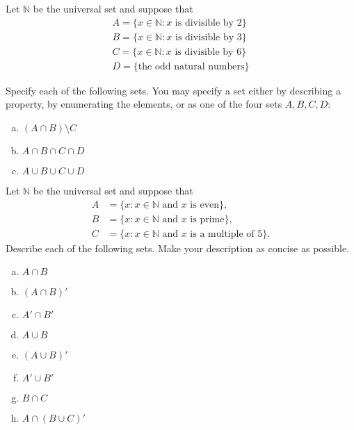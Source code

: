 \begin{exercise}\label{exercise:sets:20}
Let ${\mathbb N}$ be the universal set and suppose that
\begin{align*}
A = \{ x \in {\mathbb N} : x \text{ is divisible by 2}\} \\ 
B = \{ x \in {\mathbb N} : x \text{ is divisible by 3}\} \\ 
C = \{ x \in {\mathbb N} : x \text{ is divisible by 6}\} \\
D = \{\text{the odd natural numbers}\}
\end{align*} 

\noindent
Specify each of the following sets. You may specify a set either by describing a property, by enumerating the elements, or as one of the four sets $A, B, C, D$:
\begin{multicols}{2}
\begin{enumerate}[(a)]
\item
$(A \cap B) \setminus C$
\item
$A \cap B \cap C \cap D$
\item
$A \cup B \cup C \cup D$

\end{enumerate}
\end{multicols}
\end{exercise}

\begin{exercise}\label{exercise:sets:21}
Let ${\mathbb N}$ be the universal set and suppose that
\begin{align*}
A & = \{ x : \mbox{$x \in {\mathbb N}$ and $x$ is even} \}, \\
B & = \{x : \mbox{$x \in {\mathbb N}$ and $x$ is prime}\}, \\
C & = \{ x : \mbox{$x \in {\mathbb N}$ and $x$ is a multiple of $5$}\}.
\end{align*}
Describe each of the following sets. Make your description as concise as possible.
\begin{multicols}{2}
\begin{enumerate}[(a)]

\item
$A \cap B$

\item
$(A \cap B)'$

\item
$A' \cap B'$

\item
$A \cup B$

\item
$(A \cup B)'$

\item
$A' \cup B'$


\item
$B \cap C$

\item
$A \cap (B \cup C)'$

\end{enumerate}
\end{multicols}
\end{exercise} 


